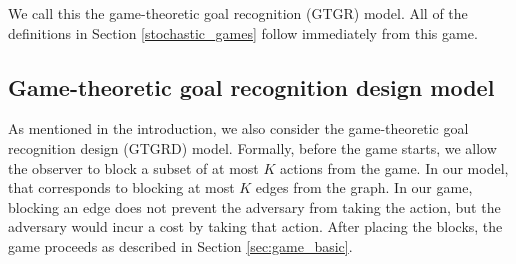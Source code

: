 We call this the game-theoretic goal recognition (GTGR) model. 
All of the definitions in Section \ref{stochastic_games} follow immediately from this game. 

\subsection{Game-theoretic goal recognition design model}
As mentioned in the introduction, we also consider the 
game-theoretic goal recognition design (GTGRD) model.
Formally, before the game starts, we allow the observer to block a subset 
of at most $K$ actions from the game. In our model, that corresponds to blocking at most $K$ edges from the graph.
In our game, blocking an edge does not prevent the adversary from taking the action,
but the adversary would incur a cost by taking that action. 
After placing the blocks, the game proceeds as described in Section \ref{sec:game_basic}.
\nocite{Dijkstra80}
\nocite{plop03-paper}
